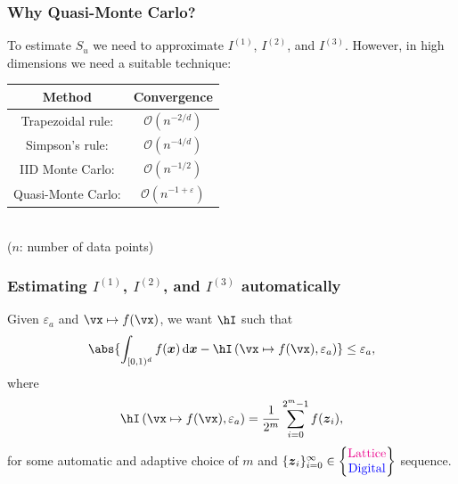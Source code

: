\documentclass[11pt,compress]{beamer} %
\newcommand{\cube}{[0,1)^d}
\newcommand{\bsz}{\boldsymbol{z}}    %
\newcommand{\bsx}{\boldsymbol{x}}    %
\newcommand{\D}{{\rm d}}
\newcommand{\intalg}{\hI\left(\vx\mapsto f(\vx),\varepsilon_a\right)}
\begin{document}
\begin{frame}
\frametitle{Why Quasi-Monte Carlo?}
To estimate $S_{u}$ we need to approximate $I^{(1)}$, $I^{(2)}$, and $I^{(3)}$. However, in high dimensions we need a suitable technique:

\centering
\begin{tabular}{|c|c|}
  \hline
  Method & Convergence \\
  \hline
   {Trapezoidal rule:} & {$\mathcal{O}(n^{-2/d})$} \\
   {Simpson's rule:} & {$\mathcal{O}(n^{-4/d})$} \\
   {IID Monte Carlo:} & {$\mathcal{O}(n^{-1/2})$} \\
   {Quasi-Monte Carlo:} & {$\mathcal{O}(n^{-1+\varepsilon})$} \\
  \hline
\end{tabular}\\
($n$: number of data points)
\end{frame}

\begin{frame}
\frametitle{Estimating $I^{(1)}$, $I^{(2)}$, and $I^{(3)}$ automatically}
Given $\varepsilon_a$ and $\vx\mapsto f(\vx)$, we want $\hI$ such that
\[
\abs{\int_{\cube} f(\bsx)\,\D\bsx - \intalg}\leq \varepsilon_a,
\]
where
\[
\intalg = \frac{1}{2^m} \sum_{i=0}^{2^m-1} f(\bsz_i),
\]
for some \alert{automatic} and \alert{adaptive} choice of $m$ and $\{\bsz_i\}_{i=0}^{\infty}
\in\begin{Bmatrix}\textcolor{magenta}{\text{Lattice}}\\\textcolor{blue}{\text{Digital}}\end{Bmatrix}$ sequence.%
\end{frame}
\end{document}
